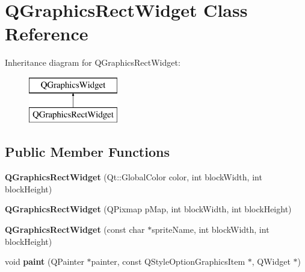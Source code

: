 \hypertarget{class_q_graphics_rect_widget}{\section{Q\-Graphics\-Rect\-Widget Class Reference}
\label{class_q_graphics_rect_widget}
}
Inheritance diagram for Q\-Graphics\-Rect\-Widget\-:\begin{figure}[H]
\begin{center}
\leavevmode
\includegraphics[height=2.000000cm]{class_q_graphics_rect_widget}
\end{center}
\end{figure}
\subsection*{Public Member Functions}
\begin{DoxyCompactItemize}
\item 
\hypertarget{class_q_graphics_rect_widget_a4d6bc01b9a360ff5f8196d1a3469bf0e}{{\bfseries Q\-Graphics\-Rect\-Widget} (Qt\-::\-Global\-Color color, int block\-Width, int block\-Height)}\label{class_q_graphics_rect_widget_a4d6bc01b9a360ff5f8196d1a3469bf0e}

\item 
\hypertarget{class_q_graphics_rect_widget_a6ece45b4d9d1228e752cc33fb114339e}{{\bfseries Q\-Graphics\-Rect\-Widget} (Q\-Pixmap p\-Map, int block\-Width, int block\-Height)}\label{class_q_graphics_rect_widget_a6ece45b4d9d1228e752cc33fb114339e}

\item 
\hypertarget{class_q_graphics_rect_widget_a55d71e9303841da12d016a577efab00f}{{\bfseries Q\-Graphics\-Rect\-Widget} (const char $\ast$sprite\-Name, int block\-Width, int block\-Height)}\label{class_q_graphics_rect_widget_a55d71e9303841da12d016a577efab00f}

\item 
\hypertarget{class_q_graphics_rect_widget_a04a48bc72523408c658e6593ea2b0e0e}{void {\bfseries paint} (Q\-Painter $\ast$painter, const Q\-Style\-Option\-Graphics\-Item $\ast$, Q\-Widget $\ast$)}\label{class_q_graphics_rect_widget_a04a48bc72523408c658e6593ea2b0e0e}

\end{DoxyCompactItemize}
